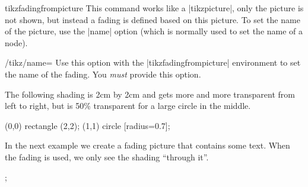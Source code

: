 \begin{environment}{{tikzfadingfrompicture}}
    This command works like a |{tikzpicture}|, only the picture is not shown,
    but instead a fading is defined based on this picture. To set the name of
    the picture, use the |name| option (which is normally used to set the name
    of a node).
    \begin{key}{/tikz/name=}
        Use this option with the |{tikzfadingfrompicture}| environment to set
        the name of the fading. You \emph{must} provide this option.
    \end{key}

    The following shading is 2cm by 2cm and gets more and more transparent from
    left to right, but is 50\% transparent for a large circle in the middle.
\begin{codeexample}[preamble={\usetikzlibrary{fadings,patterns}},pre={\begin{lateximage}},post={\end{lateximage}},svg]
\begin{tikzfadingfrompicture}[name=fade right with circle]
  \shade[left color=transparent!0,
         right color=transparent!100] (0,0) rectangle (2,2);
  \fill[transparent!50] (1,1) circle [radius=0.7];
\end{tikzfadingfrompicture}

\end{codeexample}
    In the next example we create a fading picture that contains some text.
    When the fading is used, we only see the shading ``through it''.
\begin{codeexample}[preamble={\usetikzlibrary{fadings,patterns}},pre={\begin{lateximage}},post={\end{lateximage}},svg]
\begin{tikzfadingfrompicture}[name=tikz]
  ;
\end{tikzfadingfrompicture}


\end{codeexample}
\end{environment}
